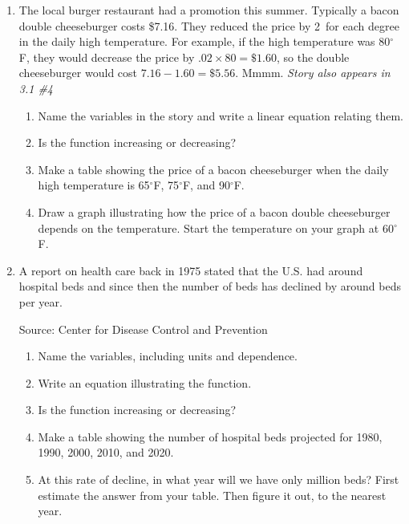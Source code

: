 \begin{enumerate}
\item The local burger restaurant had a promotion this summer.  Typically a bacon double cheeseburger costs \$7.16.  They reduced the price by 2\textcent~for each degree in the daily high temperature. For example, if the high temperature was 80$^\circ$F, they would decrease the price by $.02 \times 80 = \$1.60$, so the double cheeseburger would cost $7.16-1.60=\$5.56$.  Mmmm.
\hfill \emph{Story also appears in 3.1 \#4} 
\begin{enumerate}
\item Name the variables in the story and write a linear equation relating them.
\item Is the function increasing or decreasing?
\item Make a table showing the price of a bacon cheeseburger when the daily high temperature is 65$^\circ$F, 75$^\circ$F, and 90$^\circ$F.
\item Draw a graph illustrating how the price of a bacon double cheeseburger depends on the temperature.  Start the temperature on your graph at 60$^\circ$F.
\end{enumerate} 

\item A report on health care back in 1975 stated that the U.S. had around  hospital beds and since then the number of beds has declined by around  beds  per year.   
\hfill \begin{footnotesize} Source:  Center for Disease Control and Prevention \end{footnotesize}
\begin{enumerate}
\item Name the variables, including units and dependence.
\item Write an equation illustrating the function.
\item Is the function increasing or decreasing?
\item Make a table showing the number of hospital beds projected for 1980, 1990, 2000, 2010, and 2020.  
\item  At this rate of decline, in what year will we have only  million beds?  First estimate the answer from your table.  Then figure it out, to the nearest year.
\end{enumerate}


\end{enumerate}
